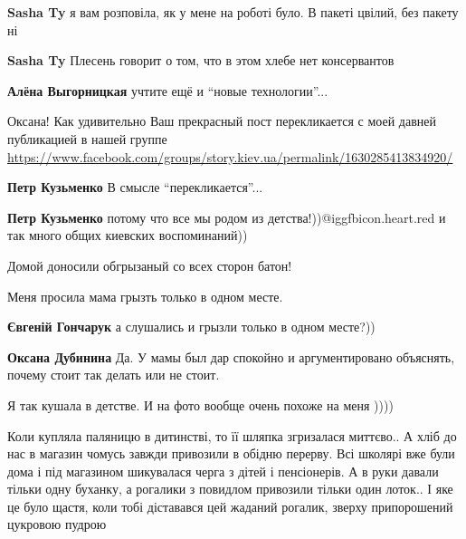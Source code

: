 \begin{itemize}
\begin{itemize}
\textbf{Sasha Ty} я вам розповіла, як у мене на роботі було.
В пакеті цвілий, без пакету ні

\textbf{Sasha Ty} Плесень говорит о том, что в этом хлебе нет консервантов

\textbf{Алёна Выгорницкая} учтите ещё и \enquote{новые технологии}...
\end{itemize} %


Оксана! Как удивительно Ваш прекрасный пост перекликается с моей давней
публикацией в нашей группе
\url{https://www.facebook.com/groups/story.kiev.ua/permalink/1630285413834920/}

\begin{itemize} %
\textbf{Петр Кузьменко}
В смысле \enquote{перекликается}...

\textbf{Петр Кузьменко} потому что все мы родом из детства!))@igg{fbicon.heart.red} и так много общих киевских воспоминаний))
\end{itemize} %

Домой доносили обгрызаный со всех сторон батон!

Меня просила мама грызть только в одном месте.

\begin{itemize} %
\textbf{Євгеній Гончарук} а слушались и грызли только в одном месте?))

\textbf{Оксана Дубинина} Да. У мамы был дар спокойно и аргументировано объяснять, почему стоит так делать или не стоит.
\end{itemize} %

Я так кушала в детстве. И на фото вообще очень похоже на меня ))))


Коли купляла паляницю в дитинстві, то її шляпка згризалася миттєво.. А хліб до
нас в магазин чомусь завжди привозили в обідню перерву. Всі школярі вже були
дома і під магазином шикувалася черга з дітей і пенсіонерів. А в руки давали
тільки одну буханку, а рогалики з повидлом привозили тільки один лоток.. І яке
це було щастя, коли тобі діставався цей жаданий рогалик, зверху припорошений
цукровою пудрою

\end{itemize} %
